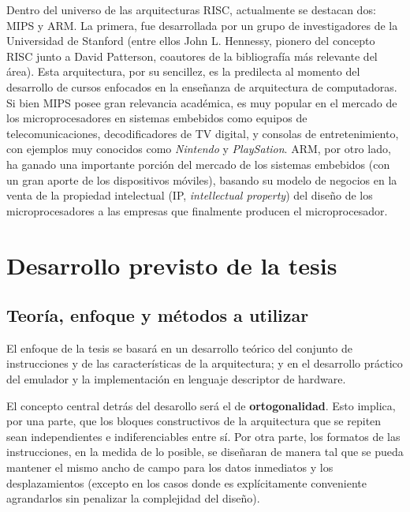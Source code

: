 \documentclass[a4paper]{article}
\begin{document}
Dentro del universo de las arquitecturas RISC, actualmente se destacan dos: MIPS y ARM. La primera, fue desarrollada por un grupo de investigadores de la Universidad de Stanford (entre ellos John L. Hennessy, pionero del concepto RISC junto a David Patterson, coautores de la bibliografía más relevante del área). Esta arquitectura, por su sencillez, es la predilecta al momento del desarrollo de cursos enfocados en la enseñanza de arquitectura de computadoras. Si bien MIPS posee gran relevancia académica, es muy popular en el mercado de los microprocesadores en sistemas embebidos como equipos de telecomunicaciones, decodificadores de TV digital, y consolas de entretenimiento, con ejemplos muy conocidos como \emph{Nintendo} y \emph{PlaySation}. ARM, por otro lado, ha ganado una importante porción del mercado de los sistemas embebidos (con un gran aporte de los dispositivos móviles), basando su modelo de negocios en la venta de la propiedad intelectual (IP, \emph{intellectual property}) del diseño de los microprocesadores a las empresas que finalmente producen el microprocesador.

\section{Desarrollo previsto de la tesis}

\subsection{Teoría, enfoque y métodos a utilizar}

El enfoque de la tesis se basará en un desarrollo teórico del conjunto de instrucciones y de las características de la arquitectura; y en el desarrollo
práctico del emulador y la implementación en lenguaje descriptor de hardware.

El concepto central detrás del desarollo será el de \textbf{ortogonalidad}. Esto implica, por una parte, que los bloques constructivos de la arquitectura que se repiten sean independientes e indiferenciables entre sí. Por otra parte, los formatos de las instrucciones, en la medida de lo posible, se diseñaran de manera tal que se pueda mantener el mismo ancho de campo para los datos inmediatos y los desplazamientos (excepto en los casos donde es explícitamente conveniente agrandarlos sin penalizar la complejidad del diseño).
\end{document}
